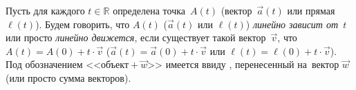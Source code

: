 



Пусть для каждого $t \in \mathbb{R}$ определена точка~$A(t)$
(вектор~$\vec{a}(t)$ или прямая~$\ell(t)$).
Будем говорить, что $A(t)$ ($\vec{a}(t)$ или $\ell(t)$)
\emph{линейно зависит от~$t$} или просто \emph{линейно движется}, если
существует такой вектор~$\vec{v}$, что
$A(t) = A(0) + t \cdot \vec v$
($\vec{a}(t) = \vec{a}(0) + t \cdot \vec{v}$ или
$\ell(t) = \ell(0) + t \cdot \vec{v}$).
Под обозначением <<$\text{объект} + \vec{w}$>> имеется ввиду ,
перенесенный на~вектор $\vec w$ (или просто сумма векторов).

